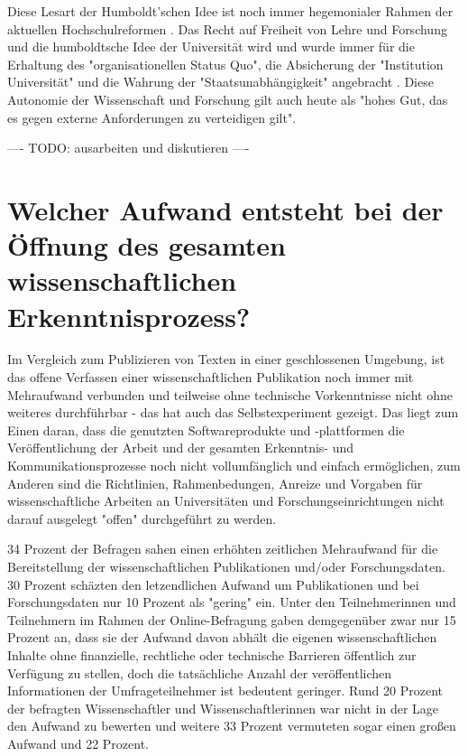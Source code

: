 Diese Lesart der Humboldt’schen Idee ist noch immer hegemonialer Rahmen der aktuellen Hochschulreformen \cite{Huber_2005}. Das Recht auf Freiheit von Lehre und Forschung und die humboldtsche Idee der Universität wird und wurde immer für die Erhaltung des "organisationellen Status Quo", die Absicherung der "Institution Universität" und die Wahrung der "Staatsunabhängigkeit" angebracht \cite{Huber_2005}. Diese Autonomie der Wissenschaft und Forschung gilt auch heute als "hohes Gut, das es gegen externe Anforderungen zu verteidigen gilt"\cite{kaldewey_2010}.

---- TODO: ausarbeiten und diskutieren ----

\section{Welcher Aufwand entsteht bei der Öffnung des gesamten wissenschaftlichen Erkenntnisprozess?}

Im Vergleich zum Publizieren von Texten in einer geschlossenen Umgebung, ist das offene Verfassen einer wissenschaftlichen Publikation noch immer mit Mehraufwand verbunden und teilweise ohne technische Vorkenntnisse nicht ohne weiteres durchführbar - das hat auch das Selbstexperiment gezeigt. Das liegt zum Einen daran, dass die genutzten Softwareprodukte und -plattformen die Veröffentlichung der Arbeit und der gesamten Erkenntnis- und Kommunikationsprozesse noch nicht vollumfänglich und einfach ermöglichen, zum Anderen sind die Richtlinien, Rahmenbedungen, Anreize und Vorgaben für wissenschaftliche Arbeiten an Universitäten und Forschungseinrichtungen nicht darauf ausgelegt "offen" durchgeführt zu werden.

34 Prozent der Befragen sahen einen erhöhten zeitlichen Mehraufwand für die Bereitstellung der wissenschaftlichen Publikationen und/oder Forschungsdaten. 30 Prozent schäzten den letzendlichen Aufwand um Publikationen und bei Forschungsdaten nur 10 Prozent als "gering" ein. Unter den Teilnehmerinnen und Teilnehmern im Rahmen der Online-Befragung gaben demgegenüber zwar nur 15 Prozent an, dass sie der Aufwand davon abhält die eigenen wissenschaftlichen Inhalte ohne finanzielle, rechtliche oder technische Barrieren öffentlich zur Verfügung zu stellen, doch die tatsächliche Anzahl der veröffentlichen Informationen der Umfrageteilnehmer ist bedeutent geringer. Rund 20 Prozent der befragten Wissenschaftler und Wissenschaftlerinnen war nicht in der Lage den Aufwand zu bewerten und weitere 33 Prozent vermuteten sogar einen großen Aufwand  und 22 Prozent.

